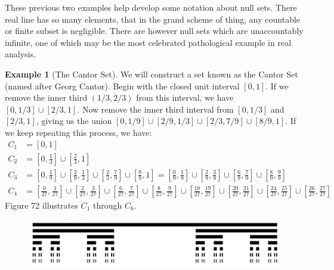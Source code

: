 \documentclass{article}
\theoremstyle{definition}
\newtheorem{example}{Example}[section]
\begin{document}
These previous two examples help develop some notation about null sets. There real line has so many elements, that in the grand scheme of thing, any countable or finite subset is negligible. There are however null sets which are unaccountably infinite, one of which may be the most celebrated pathological example in real analysis. 
\begin{example}[The Cantor Set]
 We will construct a set known as the Cantor Set (named after Georg Cantor). Begin with the closed unit interval $ [0,1] $. If we remove the inner third $ (1/3,2/3) $ from this interval, we have $ [0,1/3]\cup [2/3,1] $. Now remove the inner third interval from $  [0,1/3] $ and $ [2/3,1] $, giving us the union $[0,1/9]\cup [2/9,1/3]\cup[2/3,7/9]\cup[8/9,1]$. If we keep repeating this process, we have:
 \begin{align*}
 	C_1 &= [0,1]\\
 	C_2 &= \left[0,\frac{1}{3}\right]\cup \left[\frac{2}{3},1\right]\\
 	C_3 &= \left[0,\frac{1}{9}\right]\cup  \left[\frac{2}{9},\frac{1}{3}\right]\cup \left[\frac{2}{3},\frac{7}{9}\right]\cup \left[\frac{8}{9},1\right]= \left[\frac{0}{9},\frac{1}{9}\right]\cup  \left[\frac{2}{9},\frac{3}{9}\right]\cup \left[\frac{6}{9},\frac{7}{9}\right]\cup \left[\frac{8}{9},\frac{9}{9}\right]\\
 	C_4 & = \left[\frac{0}{27},\frac{1}{27}\right]\cup  \left[\frac{2}{27},\frac{3}{27}\right]\cup
 	\left[\frac{6}{27},\frac{7}{27}\right]\cup  \left[\frac{8}{27},\frac{9}{27}\right]\cup
 	\left[\frac{18}{27},\frac{19}{27}\right]\cup  \left[\frac{20}{27},\frac{21}{27}\right]\cup
 	\left[\frac{24}{27},\frac{25}{27}\right]\cup  \left[\frac{26}{27},\frac{27}{27}\right]
 \end{align*}
Figure 72 illustrates $ C_1 $ through $ C_6 $. 

\begin{figure}
	\centering
	\includegraphics[width=0.9\linewidth]{figures/cantor}
	\caption{}
\end{figure}

\end{example}
\end{document}
